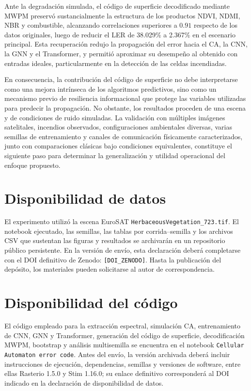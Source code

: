 \documentclass[fleqn,10pt]{wlscirep}
\begin{document}
Ante la degradación simulada, el código de superficie decodificado
mediante MWPM preservó sustancialmente la estructura de los productos
NDVI, NDMI, NBR y combustible, alcanzando correlaciones superiores a
$0.91$ respecto de los datos originales, luego de reducir el LER de 38.029\% a 2.367\% en el escenario principal. Esta recuperación redujo la
propagación del error hacia el CA, la CNN, la GNN y el Transformer, y
permitió aproximar su desempeño al obtenido con entradas ideales,
particularmente en la detección de las celdas incendiadas.

En consecuencia, la contribución del código de superficie no debe
interpretarse como una mejora intrínseca de los algoritmos predictivos,
sino como un mecanismo previo de resiliencia informacional que protege
las variables utilizadas para predecir la propagación. No obstante, los
resultados proceden de una escena y de condiciones de ruido simuladas.
La validación con múltiples imágenes satelitales, incendios observados,
configuraciones ambientales diversas, varias semillas de entrenamiento y canales de comunicación
físicamente caracterizados, junto con comparaciones clásicas bajo condiciones equivalentes, constituye el siguiente paso para determinar
la generalización y utilidad operacional del enfoque propuesto.

\section*{Disponibilidad de datos}
El experimento utilizó la escena EuroSAT \texttt{HerbaceousVegetation\_723.tif}. El notebook ejecutado, las semillas, las tablas por corrida--semilla y los archivos CSV que sustentan las figuras y resultados se archivarán en un repositorio público persistente. En la versión de envío, esta declaración deberá completarse con el DOI definitivo de Zenodo: \texttt{[DOI\_ZENODO]}. Hasta la publicación del depósito, los materiales pueden solicitarse al autor de correspondencia.

\section*{Disponibilidad del código}
El código empleado para la extracción espectral, simulación CA, entrenamiento de CNN, GNN y Transformer, generación del código de superficie, decodificación MWPM, bootstrap y análisis multisemilla se encuentra en el notebook \texttt{Cellular Automaton error code}. Antes del envío, la versión archivada deberá incluir instrucciones de ejecución, dependencias, semillas y versiones de software, entre ellas Rasterio 1.5.0 y Stim 1.16.0; su enlace definitivo corresponderá al DOI indicado en la declaración de disponibilidad de datos.
\end{document}
